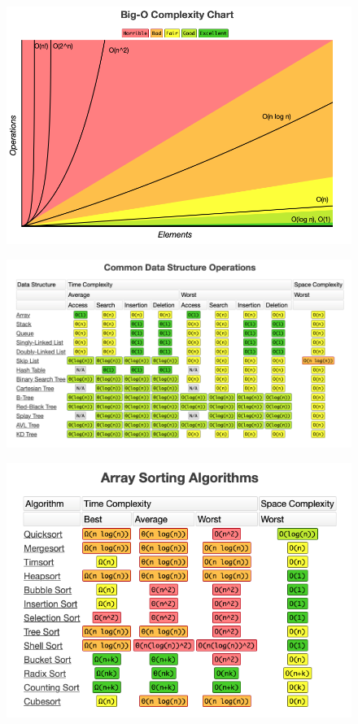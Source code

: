 \documentclass{article}
\begin{document}
\begin{figure}[!ht]
  \includegraphics[width=\linewidth]{Images/BigO_Chart.png}
  \label{fig:Chart}
\end{figure}

\begin{figure}[!ht]
  \includegraphics[width=\linewidth]{Images/DataStrucOpt.png}
  \label{fig:Chart2}
\end{figure}

\begin{figure}[!ht]
  \includegraphics[width=\linewidth]{Images/ArraySortAlg.png}
  \label{fig:Chart3}
\end{figure}
\end{document}

